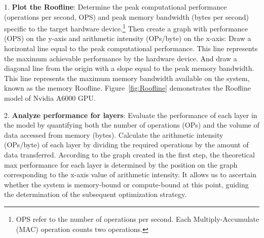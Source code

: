 1. \textbf{Plot the Roofline}: Determine the peak computational performance (operations per second, OPS) and peak memory bandwidth (bytes per second) specific to the target hardware device.\footnote{OPS refer to the number of operations per second. Each Multiply-Accumulate (MAC) operation counts two operations.}
Then create a graph with performance (OPS) on the y-axis and arithmetic intensity (OPs/byte) on the x-axis: Draw a horizontal line equal to the peak computational performance. This line represents the maximum achievable performance by the hardware device.
And draw a diagonal line from the origin with a slope equal to the peak memory bandwidth. This line represents the maximum memory bandwidth available
on the system, known as the memory Roofline.
Figure~\ref{fig:Roofline} demonstrates the Roofline model of Nvidia A6000 GPU.

2. \textbf{Analyze performance for layers}: Evaluate the performance of each layer in the model by quantifying both the number of operations (OPs) and the volume of data accessed from memory (bytes). Calculate the arithmetic intensity (OPs/byte) of each layer by dividing the required operations by the amount of data transferred. 
According to the graph created in the first step, the theoretical max performance for each layer is determined by the position on the graph corresponding to the x-axis value of arithmetic intensity. It allows us to ascertain whether the system is memory-bound or compute-bound at this point, guiding the determination of the subsequent optimization strategy.


